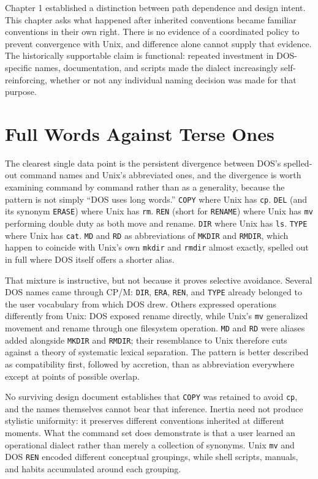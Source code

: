 \documentclass[11pt]{book}
\begin{document}
Chapter 1 established a distinction between path dependence and design intent. This chapter asks what happened after inherited conventions became familiar conventions in their own right. There is no evidence of a coordinated policy to prevent convergence with Unix, and difference alone cannot supply that evidence. The historically supportable claim is functional: repeated investment in DOS-specific names, documentation, and scripts made the dialect increasingly self-reinforcing, whether or not any individual naming decision was made for that purpose.

\section{Full Words Against Terse Ones}

The clearest single data point is the persistent divergence between DOS's spelled-out command names and Unix's abbreviated ones, and the divergence is worth examining command by command rather than as a generality, because the pattern is not simply ``DOS uses long words.'' \texttt{COPY} where Unix has \texttt{cp}. \texttt{DEL} (and its synonym \texttt{ERASE}) where Unix has \texttt{rm}. \texttt{REN} (short for \texttt{RENAME}) where Unix has \texttt{mv} performing double duty as both move and rename. \texttt{DIR} where Unix has \texttt{ls}. \texttt{TYPE} where Unix has \texttt{cat}. \texttt{MD} and \texttt{RD} as abbreviations of \texttt{MKDIR} and \texttt{RMDIR}, which happen to coincide with Unix's own \texttt{mkdir} and \texttt{rmdir} almost exactly, spelled out in full where DOS itself offers a shorter alias.

That mixture is instructive, but not because it proves selective avoidance. Several DOS names came through CP/M: \texttt{DIR}, \texttt{ERA}, \texttt{REN}, and \texttt{TYPE} already belonged to the user vocabulary from which DOS drew. Others expressed operations differently from Unix: DOS exposed rename directly, while Unix's \texttt{mv} generalized movement and rename through one filesystem operation. \texttt{MD} and \texttt{RD} were aliases added alongside \texttt{MKDIR} and \texttt{RMDIR}; their resemblance to Unix therefore cuts against a theory of systematic lexical separation. The pattern is better described as compatibility first, followed by accretion, than as abbreviation everywhere except at points of possible overlap.

No surviving design document establishes that \texttt{COPY} was retained to avoid \texttt{cp}, and the names themselves cannot bear that inference. Inertia need not produce stylistic uniformity: it preserves different conventions inherited at different moments. What the command set does demonstrate is that a user learned an operational dialect rather than merely a collection of synonyms. Unix \texttt{mv} and DOS \texttt{REN} encoded different conceptual groupings, while shell scripts, manuals, and habits accumulated around each grouping.
\end{document}

